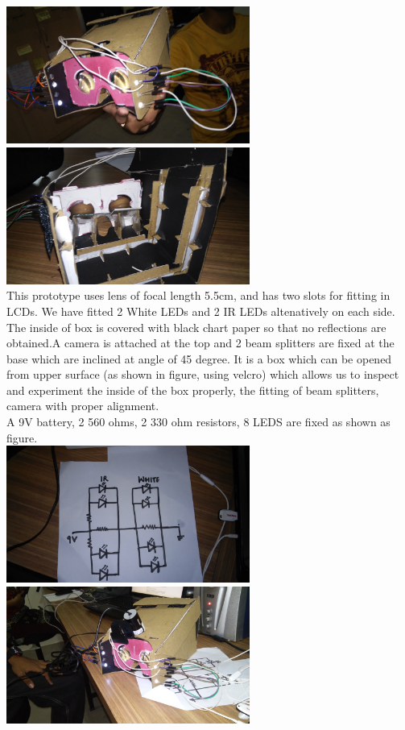 \documentclass[12pt]{article}
\begin{document}
\includegraphics[width=8cm]{20141225_172947} 
\includegraphics[width=8cm]{20141225_162310} \\


This prototype uses lens of focal length 5.5cm, and has two slots for fitting in LCDs. We have fitted 2 White LEDs and 2 IR LEDs altenatively on each side. The inside of box is covered with black chart paper so that no reflections are obtained.A camera is attached at the top  and 2 beam splitters are fixed at the base which are inclined at angle of 45 degree. It is a box which can be opened from upper surface (as shown in figure, using velcro) which allows us to inspect and experiment the inside of the box properly, the fitting of beam splitters, camera with proper alignment. \\
A  9V battery, 2 560 ohms, 2 330 ohm resistors, 8 LEDS are fixed as shown as figure.\\
 

\includegraphics[width=8cm]{20141225_171833}
\includegraphics[width=8cm]{20141225_173411} 
\end{document}
